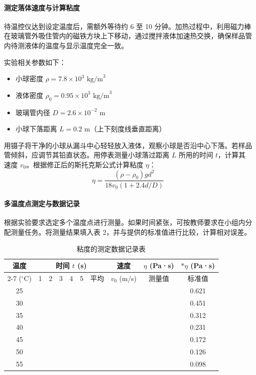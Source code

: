 \documentclass[11pt]{article}
\begin{document}
\paragraph{测定落体速度与计算粘度}
待温控仪达到设定温度后，需额外等待约 6 至 10 分钟。加热过程中，利用磁力棒在玻璃管外吸住管内的磁铁方块上下移动，通过搅拌液体加速热交换，确保样品管内待测液体的温度与显示温度完全一致。

实验相关参数如下：
\begin{itemize}
    \item 小球密度 $\rho = 7.8 \times 10^3 \text{ kg/m}^3$
    \item 液体密度 $\rho_0 = 0.95 \times 10^3 \text{ kg/m}^3$
    \item 玻璃管内径 $D = 2.6 \times 10^{-2} \text{ m}$
    \item 小球下落距离 $L = 0.2 \text{ m}$（上下刻度线垂直距离）
\end{itemize}

用镊子将干净的小球从漏斗中心轻轻放入液体，观察小球是否沿中心下落。若样品管倾斜，应调节其铅直状态。用停表测量小球落过距离 $L$ 所用的时间 $t$，计算其速度 $v_0$。根据修正后的斯托克斯公式计算粘度 $\eta$：
\begin{equation}
    \eta = \frac{(\rho - \rho_0)gd^2}{18v_0(1 + 2.4 d/D)}
\end{equation}

\paragraph{多温度点测定与数据记录}
根据实验要求选定多个温度点进行测量。如果时间紧张，可按教师要求在小组内分配测量任务。将测量结果填入表 2，并与提供的标准值进行比较，计算相对误差。

\begin{table}[htbp]
\centering
\caption{粘度的测定数据记录表}
\small
\begin{tabular}{cccccccccc}
\toprule
温度 & \multicolumn{6}{c}{时间 $t$ (s)} & 速度 & $\eta$ (Pa·s) & $*\eta$ (Pa·s) \\
\cmidrule(lr){2-7}
($^\circ$C) & 1 & 2 & 3 & 4 & 5 & 平均 & $v_0$ (m/s) & 测量值 & 标准值 \\
\midrule
25 & & & & & & & & & 0.621 \\
30 & & & & & & & & & 0.451 \\
35 & & & & & & & & & 0.312 \\
40 & & & & & & & & & 0.231 \\
45 & & & & & & & & & 0.172 \\
50 & & & & & & & & & 0.126 \\
55 & & & & & & & & & 0.098 \\
\bottomrule
\end{tabular}
\end{table}
\end{document}
